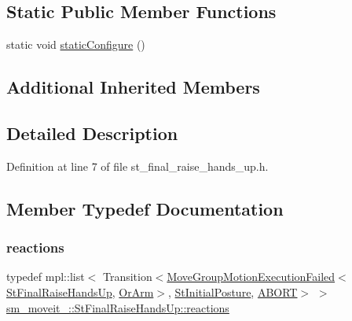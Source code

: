 \subsection*{Static Public Member Functions}
\begin{DoxyCompactItemize}
\item 
static void \hyperlink{structsm__moveit__4_1_1StFinalRaiseHandsUp_aabce6ade1a08aa3de0a2cfc1f33810bb}{static\+Configure} ()
\end{DoxyCompactItemize}
\subsection*{Additional Inherited Members}


\subsection{Detailed Description}


Definition at line 7 of file st\+\_\+final\+\_\+raise\+\_\+hands\+\_\+up.\+h.



\subsection{Member Typedef Documentation}
\mbox{\label{structsm__moveit__4_1_1StFinalRaiseHandsUp_af12b19b5e2f0f5fc3bbe6e8cee4d9bb1}} 
\subsubsection{\texorpdfstring{reactions}{reactions}}
{\footnotesize\ttfamily typedef mpl\+::list$<$ Transition$<$\hyperlink{structmoveit__z__client_1_1MoveGroupMotionExecutionFailed}{Move\+Group\+Motion\+Execution\+Failed}$<$\hyperlink{structsm__moveit__4_1_1StFinalRaiseHandsUp}{St\+Final\+Raise\+Hands\+Up}, \hyperlink{classsm__moveit__4_1_1OrArm}{Or\+Arm}$>$, \hyperlink{structsm__moveit__4_1_1StInitialPosture}{St\+Initial\+Posture}, \hyperlink{classABORT}{A\+B\+O\+RT}$>$ $>$ \hyperlink{structsm__moveit__4_1_1StFinalRaiseHandsUp_af12b19b5e2f0f5fc3bbe6e8cee4d9bb1}{sm\+\_\+moveit\+\_\+::\+St\+Final\+Raise\+Hands\+Up\+::reactions}}



